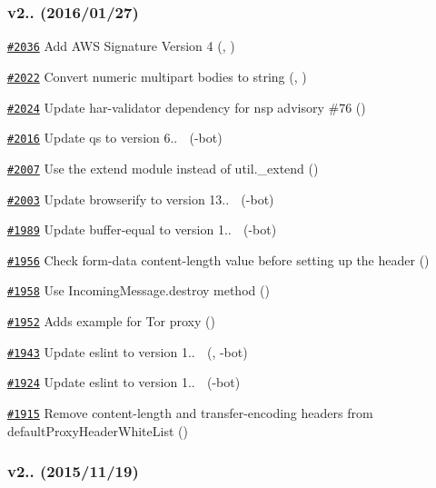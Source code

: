 \subsubsection*{v2.. (2016/01/27)}


\begin{DoxyItemize}
\item \href{https://github.com/request/request/pull/2036}{\tt \#2036} Add A\+WS Signature Version 4 (, )
\item \href{https://github.com/request/request/pull/2022}{\tt \#2022} Convert numeric multipart bodies to string (, )
\item \href{https://github.com/request/request/pull/2024}{\tt \#2024} Update har-\/validator dependency for nsp advisory \#76 ()
\item \href{https://github.com/request/request/pull/2016}{\tt \#2016} Update qs to version 6.. 🚀 (-\/bot)
\item \href{https://github.com/request/request/pull/2007}{\tt \#2007} Use the {\ttfamily extend} module instead of util.\+\_\+extend ()
\item \href{https://github.com/request/request/pull/2003}{\tt \#2003} Update browserify to version 13.. 🚀 (-\/bot)
\item \href{https://github.com/request/request/pull/1989}{\tt \#1989} Update buffer-\/equal to version 1.. 🚀 (-\/bot)
\item \href{https://github.com/request/request/pull/1956}{\tt \#1956} Check form-\/data content-\/length value before setting up the header ()
\item \href{https://github.com/request/request/pull/1958}{\tt \#1958} Use Incoming\+Message.\+destroy method ()
\item \href{https://github.com/request/request/pull/1952}{\tt \#1952} Adds example for Tor proxy ()
\item \href{https://github.com/request/request/pull/1943}{\tt \#1943} Update eslint to version 1.. 🚀 (, -\/bot)
\item \href{https://github.com/request/request/pull/1924}{\tt \#1924} Update eslint to version 1.. 🚀 (-\/bot)
\item \href{https://github.com/request/request/pull/1915}{\tt \#1915} Remove content-\/length and transfer-\/encoding headers from default\+Proxy\+Header\+White\+List ()
\end{DoxyItemize}

\subsubsection*{v2.. (2015/11/19)}


